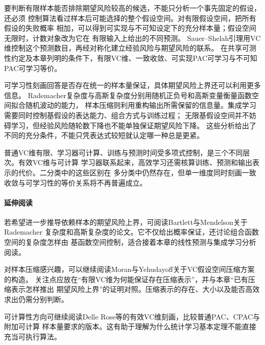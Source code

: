 要判断有限样本能否排除期望风险较高的候选，不能只分析一个事先固定的假设，还必须
控制算法看过样本后可能选择的整个假设空间。对有限假设空间，把所有假设的失败概率
相加，可以得到可实现与不可知设定下的充分样本量；假设空间无限时，计数对象改为它在
有限输入上给出的不同预测。
Sauer--Shelah引理用VC维控制这个预测数目，再经对称化建立经验风险与期望风险的联系。
在共享可测性约定及本章列明的条件下，有限VC维、一致收敛、可实现PAC可学习与不可知PAC可学习等价。

可学习性刻画回答是否存在统一的样本量保证，具体期望风险上界还可以利用更多信息。
Rademacher复杂度与高斯复杂度分别用随机正负号和高斯变量衡量函数空间拟合随机波动的能力，
样本压缩则利用重构输出所需保留的信息量。集成学习需要同时控制基假设的表达能力、组合方式与训练过程；
无限基假设空间并不妨碍学习，但经验风险随轮数下降也不能单独保证期望风险下降。
这些分析给出了不同的充分条件，不能只凭表达式较短就认定哪一种总是更紧。

普通VC维有限、学习器可计算、训练与预测时间受多项式控制，是三个不同层次。有效VC维与可计算
学习器联系起来，高效学习还需核算训练、预测和输出表示的代价。二分类中的这些区别在
多分类中仍然存在，但单一维度同时刻画一致收敛与可学习性的等价关系将不再普遍成立。

\paragraph{延伸阅读}
若希望进一步推导依赖样本的期望风险上界，可阅读Bartlett与Mendelson关于Rademacher
复杂度和高斯复杂度的论文。它不仅给出概率保证，还讨论组合函数空间的复杂度怎样由
基函数空间控制，适合接着本章的线性预测与集成学习分析阅读。

对样本压缩感兴趣，可以继续阅读Moran与Yehudayoff关于VC假设空间压缩方案的构造。
关注点应放在“有限VC维为何能保证存在压缩表示”，并与本章“已有压缩表示怎样推出
期望风险上界”的证明对照。压缩表示的存在、大小以及能否高效求出仍需分别判断。

可计算性方向可继续阅读Delle Rose等的有效VC维刻画，比较普通PAC、CPAC与附加可计算
样本量要求的版本。这有助于理解为什么统计学习基本定理不能直接充当可执行算法。
